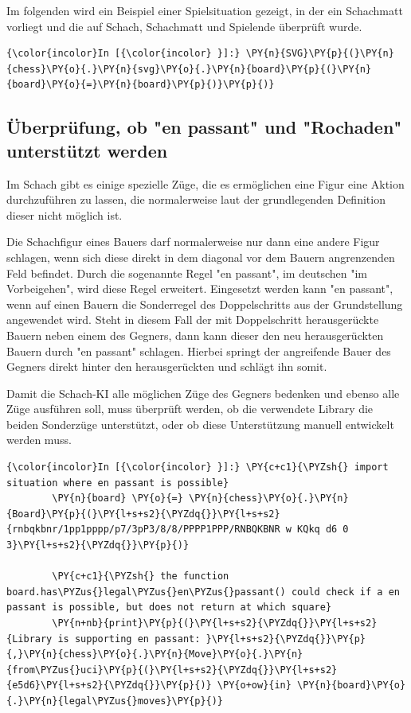    Im folgenden wird ein Beispiel einer Spielsituation gezeigt, in der ein
Schachmatt vorliegt und die auf Schach, Schachmatt und Spielende
überprüft wurde.

    \begin{Verbatim}[commandchars=\\\{\}]
{\color{incolor}In [{\color{incolor} }]:} \PY{n}{SVG}\PY{p}{(}\PY{n}{chess}\PY{o}{.}\PY{n}{svg}\PY{o}{.}\PY{n}{board}\PY{p}{(}\PY{n}{board}\PY{o}{=}\PY{n}{board}\PY{p}{)}\PY{p}{)}
\end{Verbatim}


    \subsection{Überprüfung, ob "en passant" und "Rochaden" unterstützt
werden}\label{uxfcberpruxfcfung-ob-en-passant-und-rochaden-unterstuxfctzt-werden}

Im Schach gibt es einige spezielle Züge, die es ermöglichen eine Figur
eine Aktion durchzuführen zu lassen, die normalerweise laut der
grundlegenden Definition dieser nicht möglich ist.

Die Schachfigur eines Bauers darf normalerweise nur dann eine andere
Figur schlagen, wenn sich diese direkt in dem diagonal vor dem Bauern
angrenzenden Feld befindet. Durch die sogenannte Regel "en passant", im
deutschen "im Vorbeigehen", wird diese Regel erweitert. Eingesetzt
werden kann "en passant", wenn auf einen Bauern die Sonderregel des
Doppelschritts aus der Grundstellung angewendet wird. Steht in diesem
Fall der mit Doppelschritt herausgerückte Bauern neben einem des
Gegners, dann kann dieser den neu herausgerückten Bauern durch "en
passant" schlagen. Hierbei springt der angreifende Bauer des Gegners
direkt hinter den herausgerückten und schlägt ihn somit.

Damit die Schach-KI alle möglichen Züge des Gegners bedenken und ebenso
alle Züge ausführen soll, muss überprüft werden, ob die verwendete
Library die beiden Sonderzüge unterstützt, oder ob diese Unterstützung
manuell entwickelt werden muss.

    \begin{Verbatim}[commandchars=\\\{\}]
{\color{incolor}In [{\color{incolor} }]:} \PY{c+c1}{\PYZsh{} import situation where en passant is possible}
        \PY{n}{board} \PY{o}{=} \PY{n}{chess}\PY{o}{.}\PY{n}{Board}\PY{p}{(}\PY{l+s+s2}{\PYZdq{}}\PY{l+s+s2}{rnbqkbnr/1pp1pppp/p7/3pP3/8/8/PPPP1PPP/RNBQKBNR w KQkq d6 0 3}\PY{l+s+s2}{\PYZdq{}}\PY{p}{)}
        
        \PY{c+c1}{\PYZsh{} the function board.has\PYZus{}legal\PYZus{}en\PYZus{}passant() could check if a en passant is possible, but does not return at which square}
        \PY{n+nb}{print}\PY{p}{(}\PY{l+s+s2}{\PYZdq{}}\PY{l+s+s2}{Library is supporting en passant: }\PY{l+s+s2}{\PYZdq{}}\PY{p}{,}\PY{n}{chess}\PY{o}{.}\PY{n}{Move}\PY{o}{.}\PY{n}{from\PYZus{}uci}\PY{p}{(}\PY{l+s+s2}{\PYZdq{}}\PY{l+s+s2}{e5d6}\PY{l+s+s2}{\PYZdq{}}\PY{p}{)} \PY{o+ow}{in} \PY{n}{board}\PY{o}{.}\PY{n}{legal\PYZus{}moves}\PY{p}{)}
\end{Verbatim}


